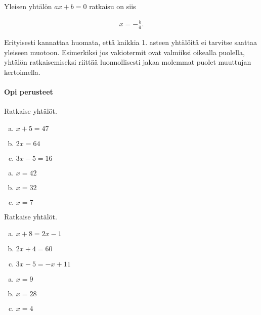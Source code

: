 Yleisen yhtälön $ax + b = 0$ ratkaisu on siis

\begin{align*}
  x = -\frac{b}{a}.
\end{align*}

Erityisesti kannattaa huomata, että kaikkia 1. asteen yhtälöitä ei tarvitse
saattaa yleiseen muotoon. Esimerkiksi jos vakiotermit ovat valmiiksi
oikealla puolella, yhtälön ratkaisemiseksi riittää luonnollisesti jakaa
molemmat puolet muuttujan kertoimella.

\begin{tehtavasivu}

\paragraph*{Opi perusteet}

\begin{tehtava}
    Ratkaise yhtälöt.
    \begin{enumerate}[(a)]
        \item $x + 5 = 47$
        \item $2x = 64$
        \item $3x - 5 = 16$
    \end{enumerate}
    \begin{vastaus}
        \begin{enumerate}[(a)]
            \item $x = 42$
            \item $x = 32$
            \item $x = 7$
        \end{enumerate}
    \end{vastaus}
\end{tehtava}

\begin{tehtava}
    Ratkaise yhtälöt.
    \begin{enumerate}[(a)]
        \item $x + 8 = 2x - 1$
        \item $2x + 4 = 60$
        \item $3x - 5 = -x + 11$
    \end{enumerate}
    \begin{vastaus}
        \begin{enumerate}[(a)]
            \item $x = 9$
            \item $x = 28$
            \item $x = 4$
        \end{enumerate}
    \end{vastaus}
\end{tehtava}


\end{tehtavasivu}
